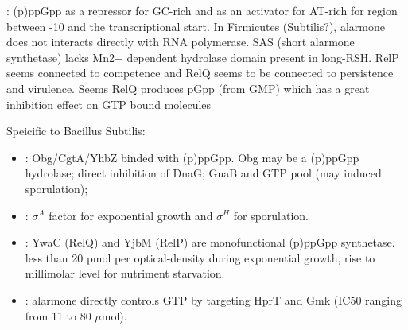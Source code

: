 \cite{GaL:15}: (p)ppGpp as a repressor for GC-rich and as an activator for AT-rich for region between -10 and the transcriptional start. In Firmicutes (Subtilis?), alarmone does not interacts directly with RNA polymerase. SAS (short alarmone synthetase) lacks Mn2+ dependent hydrolase domain present in long-RSH. RelP seems connected to competence and RelQ seems to be connected to persistence and virulence. Seems RelQ produces pGpp (from GMP) which has a great inhibition effect on GTP bound molecules

\bigskip

Speicific to Bacillus Subtilis:
\begin{itemize}
  \item \cite{KaH:12}: Obg/CgtA/YhbZ binded with (p)ppGpp. Obg may be a (p)ppGpp hydrolase; direct inhibition of DnaG; GuaB and GTP pool (may induced sporulation);
  \item \cite{Nys:04}: $\sigma^A$ factor for exponential growth and $\sigma^H$ for sporulation.
  \item \cite{AbH:15}: YwaC (RelQ) and YjbM (RelP) are monofunctional (p)ppGpp synthetase. less than 20 pmol per optical-density during exponential growth, rise to millimolar level for nutriment starvation.
  \item \cite{GaL:15}: alarmone directly controls GTP by targeting  HprT and Gmk (IC50 ranging from 11 to 80 $\mu$mol).
\end{itemize} 